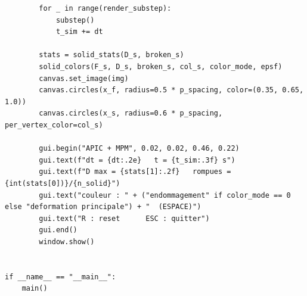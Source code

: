 \documentclass[11pt,a4paper]{article}
\begin{document}
\begin{lstlisting}
        for _ in range(render_substep):
            substep()
            t_sim += dt

        stats = solid_stats(D_s, broken_s)
        solid_colors(F_s, D_s, broken_s, col_s, color_mode, epsf)
        canvas.set_image(img)
        canvas.circles(x_f, radius=0.5 * p_spacing, color=(0.35, 0.65, 1.0))
        canvas.circles(x_s, radius=0.6 * p_spacing, per_vertex_color=col_s)

        gui.begin("APIC + MPM", 0.02, 0.02, 0.46, 0.22)
        gui.text(f"dt = {dt:.2e}   t = {t_sim:.3f} s")
        gui.text(f"D max = {stats[1]:.2f}   rompues = {int(stats[0])}/{n_solid}")
        gui.text("couleur : " + ("endommagement" if color_mode == 0 else "deformation principale") + "  (ESPACE)")
        gui.text("R : reset      ESC : quitter")
        gui.end()
        window.show()


if __name__ == "__main__":
    main()
\end{lstlisting}
\end{document}
